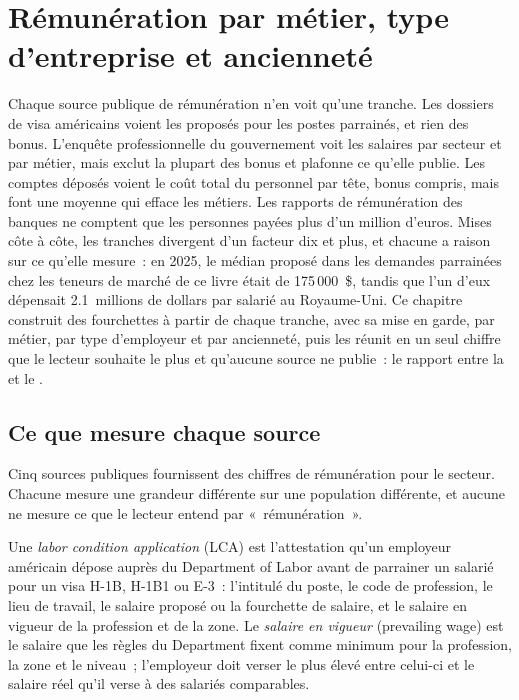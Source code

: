 \chapter{Rémunération par métier, type d'entreprise et ancienneté}\label{ch:in:pay-levels-by-role-firm-type-and-seniority}

Chaque source publique de rémunération n'en voit qu'une tranche. Les dossiers de visa américains voient les  proposés pour les postes parrainés, et
rien des bonus. L'enquête professionnelle du gouvernement voit les salaires par secteur et par métier, mais exclut la plupart
des bonus et plafonne ce qu'elle publie. Les comptes déposés voient le coût total du personnel par tête, bonus compris, mais font une moyenne qui efface les
métiers. Les rapports de rémunération des banques ne comptent que les personnes payées plus d'un million d'euros. Mises côte à côte, les tranches
divergent d'un facteur dix et plus, et chacune a raison sur ce qu'elle mesure~: en 2025, le  médian proposé
dans les demandes parrainées chez les teneurs de marché de ce livre était de 175\,000~\$, tandis que l'un d'eux dépensait 2.1~millions de dollars par
salarié au Royaume-Uni. Ce chapitre construit des fourchettes à partir de chaque tranche, avec sa mise en garde, par métier, par type d'employeur et par
ancienneté, puis les réunit en un seul chiffre que le lecteur souhaite le plus et qu'aucune source ne publie~: le rapport entre la  et
le .

\section{Ce que mesure chaque source}

Cinq sources publiques fournissent des chiffres de rémunération pour le secteur. Chacune mesure une grandeur différente sur une population différente, et
aucune ne mesure ce que le lecteur entend par «~rémunération~».

\begin{definition}\label{def:in:pay-levels-by-role-firm-type-and-seniority:lca}
Une \emph{labor condition application} (LCA) est l'attestation qu'un employeur américain dépose
auprès du Department of Labor avant de parrainer un salarié pour un visa H-1B, H-1B1 ou E-3~: l'intitulé du poste, le code de profession,
le lieu de travail, le salaire proposé ou la fourchette de salaire, et le salaire en vigueur de la profession et de la zone.
Le \emph{salaire en vigueur} (prevailing wage) est le salaire que les règles du Department fixent comme minimum pour la profession, la zone et le niveau~;
l'employeur doit verser le plus élevé entre celui-ci et le salaire réel qu'il verse à des salariés comparables.
\end{definition}


